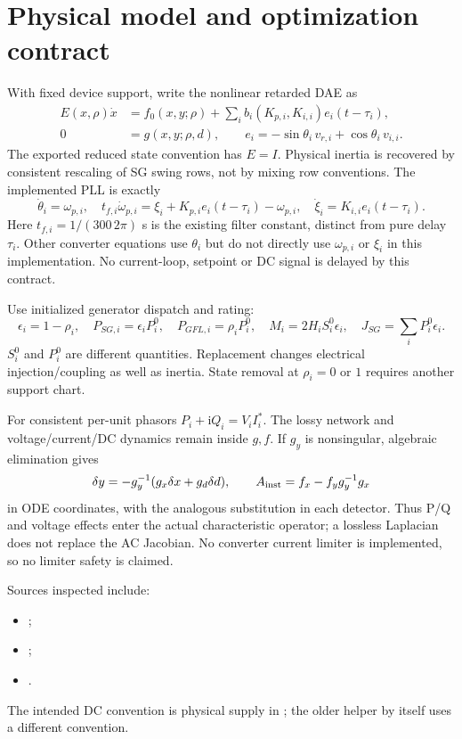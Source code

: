 \documentclass[11pt]{article}
\newcommand{\ii}{\mathrm{i}}
\begin{document}
\section{Physical model and optimization contract}\label{sec:model}
With fixed device support, write the nonlinear retarded DAE as
\begin{align}
 E(x,\rho)\dot x&=f_0(x,y;\rho)+\sum_i b_i(K_{p,i},K_{i,i})e_i(t-\tau_i),\\
 0&=g(x,y;\rho,d),\qquad
 e_i=-\sin\theta_i\,v_{r,i}+\cos\theta_i\,v_{i,i}. \label{eq:dae}
\end{align}
The exported reduced state convention has $E=I$. Physical inertia is
recovered by consistent rescaling of SG swing rows, not by mixing row
conventions. The implemented PLL is exactly
\begin{equation}
 \dot\theta_i=\omega_{p,i},\quad
 t_{f,i}\dot\omega_{p,i}=\xi_i+K_{p,i}e_i(t-\tau_i)-\omega_{p,i},
 \quad \dot\xi_i=K_{i,i}e_i(t-\tau_i). \label{eq:pll}
\end{equation}
Here $t_{f,i}=1/(300\,2\pi)$ s is the existing filter constant, distinct
from pure delay $\tau_i$. Other converter equations use $\theta_i$ but
do not directly use $\omega_{p,i}$ or $\xi_i$ in this implementation.
No current-loop, setpoint or DC signal is delayed by this contract.

Use initialized generator dispatch and rating:
\[
 \epsilon_i=1-\rho_i,\quad P_{SG,i}=\epsilon_iP_i^0,\quad
 P_{GFL,i}=\rho_iP_i^0,\quad M_i=2H_iS_i^0\epsilon_i,\quad
 J_{SG}=\sum_iP_i^0\epsilon_i .
\]
$S_i^0$ and $P_i^0$ are different quantities. Replacement changes
electrical injection/coupling as well as inertia. State removal at
$\rho_i=0$ or $1$ requires another support chart.

For consistent per-unit phasors $P_i+\ii Q_i=V_iI_i^*$.
The lossy network and voltage/current/DC dynamics remain inside $g,f$.
If $g_y$ is nonsingular, algebraic elimination gives
\[
 \delta y=-g_y^{-1}(g_x\delta x+g_d\delta d),\qquad
 A_{\rm inst}=f_x-f_yg_y^{-1}g_x
\]
in ODE coordinates, with the analogous substitution in each detector.
Thus P/Q and voltage effects enter the actual characteristic operator;
a lossless Laplacian does not replace the AC Jacobian.
No converter current limiter is implemented, so no limiter safety is claimed.

Sources inspected include:
\begin{itemize}
\item {};
\item {};
\item {}.
\end{itemize}
The intended DC convention is physical supply in ;
the older helper by itself uses a different convention.
\end{document}
